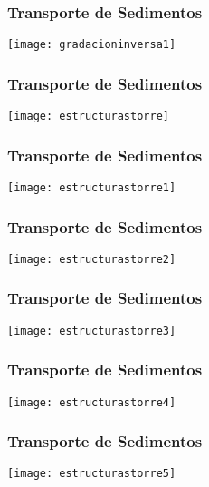\documentclass{beamer}
\begin{document}
\begin{frame}
\frametitle{Transporte de Sedimentos}
\begin{center}
   	\texttt{[image: gradacioninversa1]}
\end{center}
\end{frame}
\begin{frame}
\frametitle{Transporte de Sedimentos}
\begin{center}
   	\texttt{[image: estructurastorre]}
\end{center}
\end{frame}
\begin{frame}
\frametitle{Transporte de Sedimentos}
\begin{center}
   	\texttt{[image: estructurastorre1]}
\end{center}
\end{frame}
\begin{frame}
\frametitle{Transporte de Sedimentos}
\begin{center}
   	\texttt{[image: estructurastorre2]}
\end{center}
\end{frame}
\begin{frame}
\frametitle{Transporte de Sedimentos}
\begin{center}
   	\texttt{[image: estructurastorre3]}
\end{center}
\end{frame}
\begin{frame}
\frametitle{Transporte de Sedimentos}
\begin{center}
   	\texttt{[image: estructurastorre4]}
\end{center}
\end{frame}
\begin{frame}
\frametitle{Transporte de Sedimentos}
\begin{center}
   	\texttt{[image: estructurastorre5]}
\end{center}
\end{frame}
\end{document}
